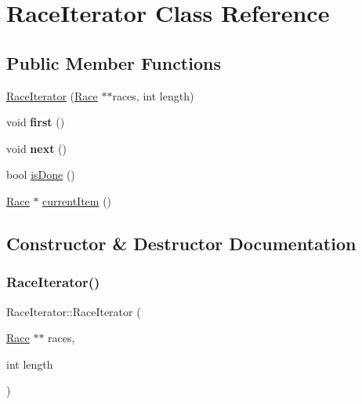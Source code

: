 \hypertarget{classRaceIterator}{}\section{Race\+Iterator Class Reference}
\label{classRaceIterator}
\subsection*{Public Member Functions}
\begin{DoxyCompactItemize}
\item 
\hyperlink{classRaceIterator_a9610179f3d991dc1611574451d7306ea}{Race\+Iterator} (\hyperlink{classRace}{Race} $\ast$$\ast$races, int length)
\item 
\mbox{\label{classRaceIterator_abfb9e2f16da89b19285414181d6bc7c0}} 
void {\bfseries first} ()
\item 
\mbox{\label{classRaceIterator_ae2a022fadedd9f0c51f9b3f8f994985f}} 
void {\bfseries next} ()
\item 
bool \hyperlink{classRaceIterator_a406ce41eae09904a94502f80344f537d}{is\+Done} ()
\item 
\hyperlink{classRace}{Race} $\ast$ \hyperlink{classRaceIterator_adceb8655316b9b0ca00dbe4494ece887}{current\+Item} ()
\end{DoxyCompactItemize}


\subsection{Constructor \& Destructor Documentation}
\mbox{\label{classRaceIterator_a9610179f3d991dc1611574451d7306ea}} 
\subsubsection{\texorpdfstring{Race\+Iterator()}{RaceIterator()}}
{\footnotesize\ttfamily Race\+Iterator\+::\+Race\+Iterator (\begin{DoxyParamCaption}\item[{\hyperlink{classRace}{Race} $\ast$$\ast$}]{races,  }\item[{int}]{length }\end{DoxyParamCaption})}



